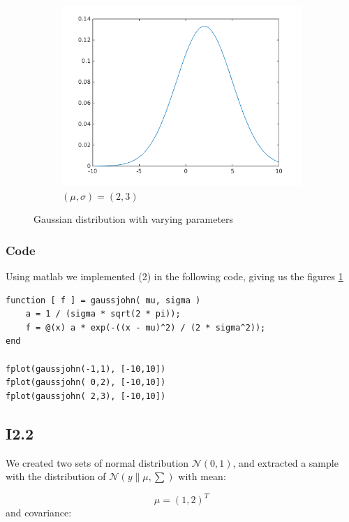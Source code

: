 \documentclass{article}
\begin{document}
\begin{figure}[!ht]
\begin{subfigure}[b]{0.4\textwidth}
        \includegraphics[width=\textwidth]{part1/I213.png}
        \caption{$(\mu, \sigma) = (2,3)$}
    \end{subfigure}
    \caption{Gaussian distribution with varying parameters}
    \label{fig:I1.1}
\end{figure}

\subsubsection{Code}

Using matlab we implemented (2) in the following code, giving us the
figures \ref{fig:I1.1}

\begin{verbatim}
function [ f ] = gaussjohn( mu, sigma )
    a = 1 / (sigma * sqrt(2 * pi));
    f = @(x) a * exp(-((x - mu)^2) / (2 * sigma^2));
end

fplot(gaussjohn(-1,1), [-10,10])
fplot(gaussjohn( 0,2), [-10,10])
fplot(gaussjohn( 2,3), [-10,10])
\end{verbatim}

\subsection{I2.2}

We created two sets of normal distribution $\mathscr{N}(0,1)$, and extracted a sample with the distribution of $\mathscr{N}(y \| \mu, \sum)$ 
with mean:

\begin{equation}\label{eq:2.2mean}
    \mu = (1,2)^T
\end{equation} 
and covariance:
\end{document}
